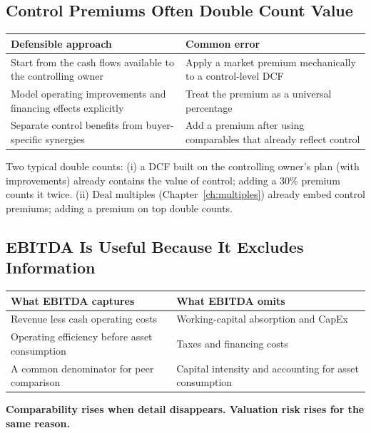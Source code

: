 \subsection{Control Premiums Often Double Count Value}
\begin{center}
\small
\begin{tabular}{@{}p{7cm}p{7cm}@{}}
\toprule
\textbf{Defensible approach} & \textbf{Common error}\\
\midrule
Start from the cash flows available to the controlling owner & Apply a market premium mechanically to a control-level DCF\\
Model operating improvements and financing effects explicitly & Treat the premium as a universal percentage\\
Separate control benefits from buyer-specific synergies & Add a premium after using comparables that already reflect control\\
\bottomrule
\end{tabular}
\end{center}
\begin{addbox}
Two typical double counts: (i) a DCF built on the controlling owner's plan (with improvements) already contains the value of control; adding a 30\% premium counts it twice. (ii) Deal multiples (Chapter~\ref{ch:multiples}) already embed control premiums; adding a premium on top double counts.
\end{addbox}

\subsection{EBITDA Is Useful Because It Excludes Information}
\begin{center}
\small
\begin{tabular}{@{}p{7cm}p{7cm}@{}}
\toprule
\textbf{What EBITDA captures} & \textbf{What EBITDA omits}\\
\midrule
Revenue less cash operating costs & Working-capital absorption and CapEx\\
Operating efficiency before asset consumption & Taxes and financing costs\\
A common denominator for peer comparison & Capital intensity and accounting for asset consumption\\
\bottomrule
\end{tabular}
\end{center}
\begin{keybox}
\textbf{Comparability rises when detail disappears. Valuation risk rises for the same reason.}
\end{keybox}


